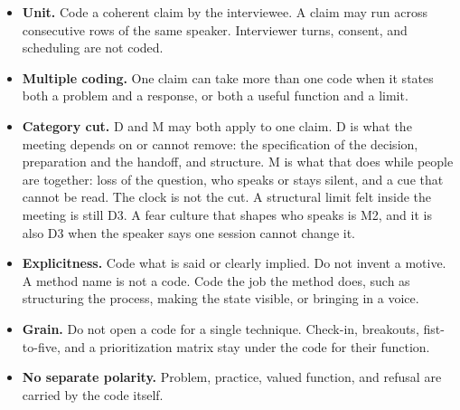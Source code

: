 \begin{itemize}
  \item \textbf{Unit.}
    Code a coherent claim by the interviewee. A claim may run across consecutive rows of the same
    speaker. Interviewer turns, consent, and scheduling are not coded.
  \item \textbf{Multiple coding.}
    One claim can take more than one code when it states both a problem and a response, or both a
    useful function and a limit.
  \item \textbf{Category cut.}
    D and M may both apply to one claim.
    D is what the meeting depends on or cannot remove: the specification of the decision,
    preparation and the handoff, and structure.
    M is what that does while people are together: loss of the question, who speaks or stays
    silent, and a cue that cannot be read.
    The clock is not the cut.
    A structural limit felt inside the meeting is still D3.
    A fear culture that shapes who speaks is M2, and it is also D3 when the speaker says one
    session cannot change it.
  \item \textbf{Explicitness.}
    Code what is said or clearly implied. Do not invent a motive.
    A method name is not a code. Code the job the method does, such as structuring the process,
    making the state visible, or bringing in a voice.
  \item \textbf{Grain.}
    Do not open a code for a single technique. Check-in, breakouts, fist-to-five, and a
    prioritization matrix stay under the code for their function.
  \item \textbf{No separate polarity.}
    Problem, practice, valued function, and refusal are carried by the code itself.
\end{itemize}

